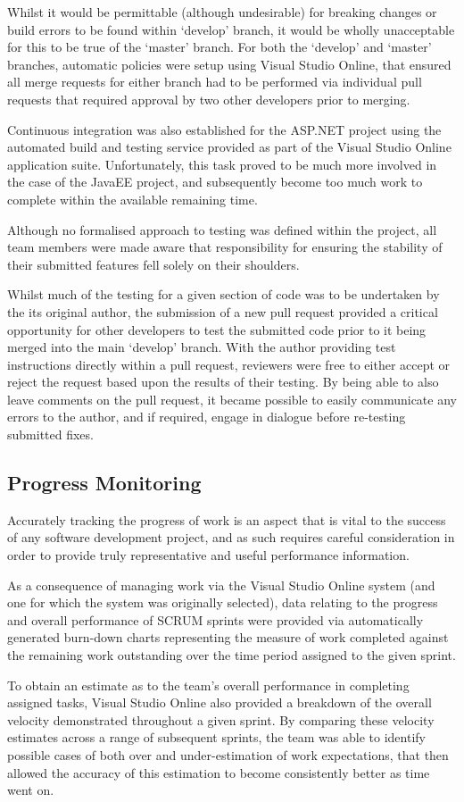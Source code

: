 Whilst it would be permittable (although undesirable) for breaking changes or build errors to be found within `develop' branch, it would be wholly unacceptable for this to be true of the `master' branch. For both the `develop' and `master' branches, automatic policies were setup using Visual Studio Online, that ensured all merge requests for either branch had to be performed via individual pull requests that required approval by two other developers prior to merging.

Continuous integration was also established for the ASP.NET project using the automated build and testing service provided as part of the Visual Studio Online application suite. Unfortunately, this task proved to be much more involved in the case of the JavaEE project, and subsequently become too much work to complete within the available remaining time. 


Although no formalised approach to testing was defined within the project, all team members were made aware that responsibility for ensuring the stability of their submitted features fell solely on their shoulders. 

Whilst much of the testing for a given section of code was to be undertaken by the its original author, the submission of a new pull request provided a critical opportunity for other developers to test the submitted code prior to it being merged into the main `develop' branch. With the author providing test instructions directly within a pull request, reviewers were free to either accept or reject the request based upon the results of their testing. By being able to also leave comments on the pull request, it became possible to easily communicate any errors to the author, and if required, engage in dialogue before re-testing submitted fixes.

\subsection{Progress Monitoring}

Accurately tracking the progress of work is an aspect that is vital to the success of any software development project, and as such requires careful consideration in order to provide truly representative and useful performance information. 

As a consequence of managing work via the Visual Studio Online system (and one for which the system was originally selected), data relating to the progress and overall performance of SCRUM sprints were provided via automatically generated burn-down charts representing the measure of work completed against the remaining work outstanding over the time period assigned to the given sprint.

To obtain an estimate as to the team's overall performance in completing assigned tasks, Visual Studio Online also provided a breakdown of the overall velocity demonstrated throughout a given sprint. By comparing these velocity estimates across a range of subsequent sprints, the team was able to identify possible cases of both over and under-estimation of work expectations, that then allowed the accuracy of this estimation to become consistently better as time went on.


